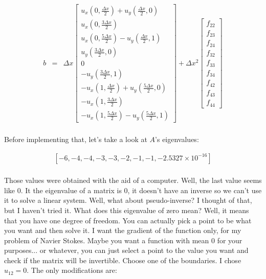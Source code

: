 \documentclass[11pt]{article}
\begin{document}
\begin{eqnarray}
b & = & \Delta x\left[\begin{array}{c}
u_x\left(0, \frac{\Delta x}{2}\right) + u_y\left(\frac{\Delta x}{2},0\right)\\
u_x\left(0, \frac{3\Delta x}{2}\right)\\
u_x\left(0, \frac{5\Delta x}{2}\right) - u_y\left(\frac{\Delta x}{2},1\right)\\
u_y\left(\frac{3\Delta x}{2},0\right)\\
0 \\
-u_y\left(\frac{3\Delta x}{2},1\right)\\
-u_x\left(1, \frac{\Delta x}{2}\right) + u_y\left(\frac{5\Delta x}{2},0\right)\\
-u_x\left(1, \frac{3\Delta x}{2}\right)\\
-u_x\left(1, \frac{5\Delta x}{2}\right) - u_y\left(\frac{5\Delta x}{2}, 1\right)
\end{array}\right] + \Delta x^2 \left[\begin{array}{c}
f_{22}\\ f_{23}\\ f_{24}	\\ f_{32}\\ f_{33}\\ f_{34}\\ f_{42}\\f_{43} \\f_{44}
\end{array}\right]
\end{eqnarray}

\paragraph{} Before implementing that, let's take a look at $A$'s eigenvalues:

\begin{eqnarray}
\left[ -6, -4, -4, -3, -3, -2, -1, -1, -2.5327\times 10^{-16}\right]
\end{eqnarray}

\paragraph{} Those values were obtained with the aid of a computer. Well, the last value seems like 0. It the eigenvalue of a matrix is 0, it doesn't have an inverse so we can't use it to solve a linear system. Well, what about pseudo-inverse? I thought of that, but I haven't tried it. What does this eigenvalue of zero mean? Well, it means that you have one degree of freedom. You can actually pick a point to be what you want and then solve it. I want the gradient of the function only, for my problem of Navier Stokes. Maybe you want a function with mean 0 for your purposes... or whatever, you can just select a point to the value you want and check if the matrix will be invertible. Choose one of the boundaries. I chose $u_{12} = 0$. The only modifications are:
\end{document}
